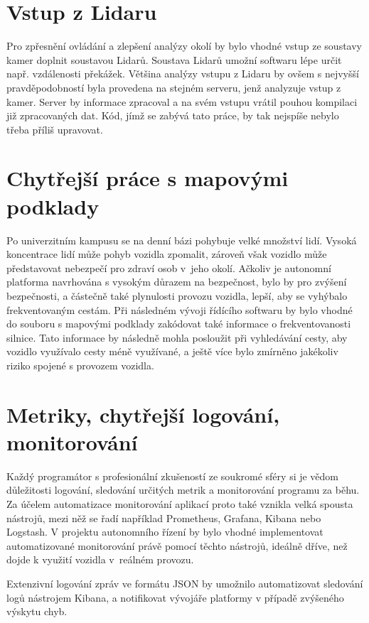 \documentclass[czech, bachelor]{diploma}
\begin{document}
\section{Vstup z Lidaru}

Pro zpřesnění ovládání a zlepšení analýzy okolí by bylo vhodné vstup ze soustavy kamer doplnit soustavou Lidarů. Soustava Lidarů
umožní softwaru lépe určit např. vzdálenosti překážek. Většina analýzy vstupu z Lidaru by ovšem s nejvyšší pravděpodobností byla
provedena na stejném serveru, jenž analyzuje vstup z kamer. Server by informace zpracoval a na svém vstupu vrátil pouhou kompilaci
již zpracovaných dat. Kód, jímž se zabývá tato práce, by tak nejspíše nebylo třeba příliš upravovat.

\section{Chytřejší práce s mapovými podklady} \label{smarter-maps}

Po univerzitním kampusu se na denní bázi pohybuje velké množství lidí. Vysoká koncentrace lidí může pohyb vozidla zpomalit,
zároveň však vozidlo může představovat nebezpečí pro zdraví osob v~jeho okolí. Ačkoliv je autonomní platforma navrhována s vysokým
důrazem na bezpečnost, bylo by pro zvýšení bezpečnosti, a částečně také plynulosti provozu vozidla, lepší, aby se vyhýbalo
frekventovaným cestám. Při následném vývoji řídícího softwaru by bylo vhodné do souboru s mapovými podklady zakódovat také
informace o frekventovanosti silnice. Tato informace by následně mohla posloužit při vyhledávání cesty, aby vozidlo využívalo
cesty méně využívané, a ještě více bylo zmírněno jakékoliv riziko spojené s provozem vozidla.

\section{Metriky, chytřejší logování, monitorování}

Každý programátor s profesionální zkušeností ze soukromé sféry si je vědom důležitosti logování, sledování určitých metrik
a monitorování programu za běhu. Za účelem automatizace monitorování aplikací proto také vznikla velká spousta nástrojů, mezi něž
se řadí například Prometheus, Grafana, Kibana nebo Logstash. V projektu autonomního řízení by bylo vhodné implementovat
automatizované monitorování právě pomocí těchto nástrojů, ideálně dříve, než dojde k využití vozidla v~reálném provozu.

Extenzivní logování zpráv ve formátu JSON by umožnilo automatizovat sledování logů nástrojem Kibana, a notifikovat vývojáře
platformy v případě zvýšeného výskytu chyb.
\end{document}
